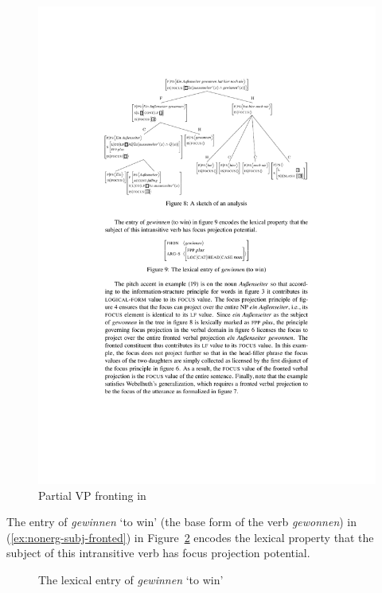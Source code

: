 \documentclass[output=paper]{langsci/langscibook}
\begin{document}
  \begin{figure}[htb]
    \centering
    \includegraphics[scale=0.9]{figures/vp-focus-exponent}
    \caption{Partial VP fronting in \cite{dKM2003a}}
    \label{fig:focus-exponent}
  \end{figure}
  The entry of \textit{gewinnen} `to win' (the base form of the verb
  \textit{gewonnen}) in (\ref{ex:nonerg-subj-fronted}) in
  Figure~\ref{fig:lex-entry} encodes the lexical property that the
  subject of this intransitive verb has focus projection potential.
\begin{figure}[htb!]
%
\begin{center}
  \begin{avm}
  \end{avm}
\caption{The lexical entry of \textit{gewinnen} `to win'}
\label{fig:lex-entry}
\end{center}\unskip
\end{figure}
\end{document}
